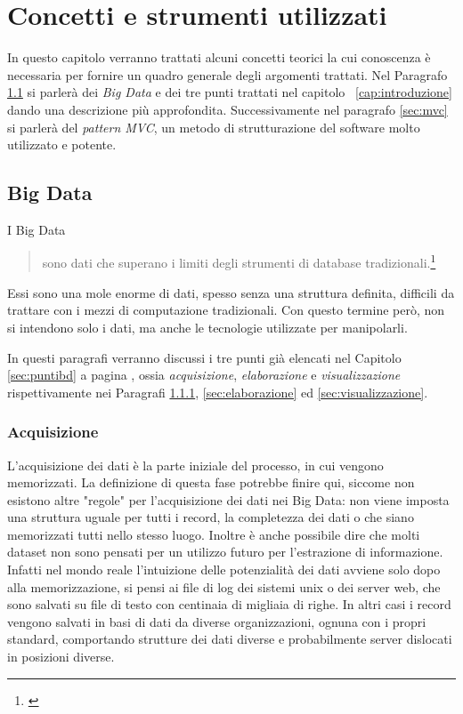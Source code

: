 \chapter{Concetti e strumenti utilizzati}
In questo capitolo verranno trattati alcuni concetti teorici la cui conoscenza è necessaria per fornire un quadro generale degli argomenti trattati. Nel Paragrafo \ref{sec:bigdata} si parlerà dei \emph{Big Data} e dei tre punti trattati nel capitolo~ \ref{cap:introduzione} dando una descrizione più approfondita. Successivamente nel paragrafo \ref{sec:mvc} si parlerà del \emph{pattern MVC}, un metodo di strutturazione del software molto utilizzato e potente.


\section{Big Data}\label{sec:bigdata}
I Big Data
\begin{quote}
sono dati che superano i limiti degli strumenti di database tradizionali.\footnote{\cite{rezzani2013big}}
\end{quote} 
Essi sono una mole enorme di dati, spesso senza una struttura definita, difficili da trattare con i mezzi di computazione tradizionali. Con questo termine però, non si intendono solo i dati, ma anche le tecnologie utilizzate per manipolarli.

In questi paragrafi verranno discussi i tre punti già elencati nel Capitolo \ref{sec:puntibd} a pagina \pageref{sec:puntibd}, ossia \emph{acquisizione}, \emph{elaborazione} e \emph{visualizzazione} rispettivamente nei Paragrafi \ref{sec:acquisizione}, \ref{sec:elaborazione} ed \ref{sec:visualizzazione}.


\subsection{Acquisizione}\label{sec:acquisizione}
L'acquisizione dei dati è la parte iniziale del processo, in cui vengono memorizzati. La definizione di questa fase potrebbe finire qui, siccome non esistono altre "regole" per l'acquisizione dei dati nei Big Data: non viene imposta una struttura uguale per tutti i record, la completezza dei dati o che siano memorizzati tutti nello stesso luogo. Inoltre è anche possibile dire che molti dataset non sono pensati per un utilizzo futuro per l'estrazione di informazione. Infatti nel mondo reale l'intuizione delle potenzialità dei dati avviene solo dopo alla memorizzazione, si pensi ai file di log dei sistemi unix o dei server web, che sono salvati su file di testo con centinaia di migliaia di righe. In altri casi i record vengono salvati in basi di dati da diverse organizzazioni, ognuna con i propri standard, comportando strutture dei dati diverse e probabilmente server dislocati in posizioni diverse.


